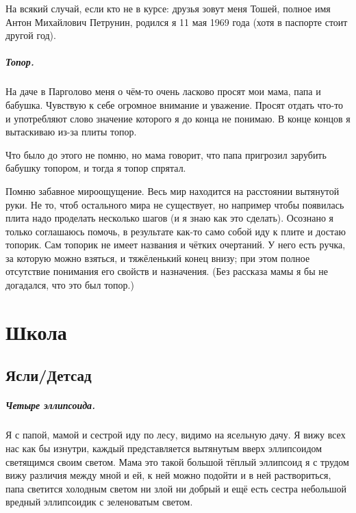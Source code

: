 \documentclass{book}
\begin{document}
На всякий случай, если кто не в курсе: друзья зовут меня Тошей, полное имя Антон Михайлович Петрунин, родился я 11 мая 1969 года (хотя в паспорте стоит другой год).

\paragraph{Топор.}
На даче в Парголово меня о чём-то очень ласково просят мои мама, папа и бабушка.
Чувствую к себе огромное внимание и уважение.
Просят отдать что-то и употребляют слово значение которого я до конца не понимаю.
В конце концов я вытаскиваю из-за плиты топор.

Что было до этого не помню, но мама говорит, что папа пригрозил зарубить бабушку топором,
и тогда я топор спрятал.

Помню забавное мироощущение. 
Весь мир находится на расстоянии вытянутой руки.
Не то, чтоб остального мира не существует, но например чтобы появилась плита надо проделать несколько шагов (и я знаю как это сделать).
Осознано я только соглашаюсь помочь, в результате как-то само собой иду к плите и достаю топорик.
Сам топорик не имеет названия и чётких очертаний.
У него есть ручка, за которую можно взяться, и тяжёленький конец внизу; при этом полное отсутствие понимания его свойств и назначения.
(Без рассказа мамы я бы не догадался, что это был топор.)

\chapter*{Школа}

\section*{Ясли/Детсад}

\paragraph{Четыре эллипсоида.}
Я с папой, мамой и сестрой иду по лесу, видимо на ясельную дачу.
Я вижу всех нас как бы изнутри, каждый представляется вытянутым вверх эллипсоидом светящимся своим светом.
Мама это такой большой тёплый эллипсоид я с трудом вижу различия между мной и ей, к ней можно подойти и в ней раствориться, папа светится холодным светом ни злой ни добрый и ещё есть сестра небольшой вредный эллипсоидик с зеленоватым светом.
\end{document}
